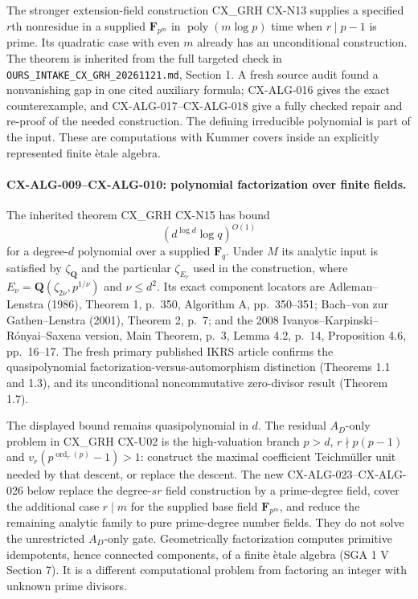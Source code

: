 The stronger extension-field construction CX\_GRH CX-N13 supplies a specified
$r$th nonresidue in a supplied $\mathbf F_{p^m}$ in
$\operatorname{poly}(m\log p)$ time when $r\mid p-1$ is prime. Its quadratic
case with even $m$ already has an unconditional construction. The theorem is
inherited from the full targeted check in
\texttt{OURS\_INTAKE\_CX\_GRH\_20261121.md}, Section 1. A fresh source audit
found a nonvanishing gap in one cited auxiliary formula; CX-ALG-016 gives
the exact counterexample, and CX-ALG-017--CX-ALG-018 give a fully checked
repair and re-proof of the needed construction. The defining
irreducible polynomial is part of the input. These are computations with
Kummer covers inside an explicitly represented finite \`etale algebra.

\paragraph{CX-ALG-009--CX-ALG-010: polynomial factorization over finite fields.}
The inherited theorem CX\_GRH CX-N15 has bound
\[
                 (d^{\log d}\log q)^{O(1)}
\]
for a degree-$d$ polynomial over a supplied $\mathbf F_q$. Under $M$ its
analytic input is satisfied by $\zeta_{\mathbf Q}$ and the particular
$\zeta_{E_\nu}$ used in the construction, where
$E_\nu=\mathbf Q(\zeta_{2\nu},p^{1/\nu})$ and $\nu\leq d^2$.
Its exact component locators are Adleman--Lenstra (1986), Theorem 1, p.~350,
Algorithm A, pp.~350--351; Bach--von zur Gathen--Lenstra (2001), Theorem 2,
p.~7; and the 2008 Ivanyos--Karpinski--R\'onyai--Saxena version, Main Theorem,
p.~3, Lemma 4.2, p.~14, Proposition 4.6, pp.~16--17.
The fresh primary published IKRS article confirms the quasipolynomial
factorization-versus-automorphism distinction (Theorems 1.1 and 1.3), and
its unconditional noncommutative zero-divisor result (Theorem 1.7).

The displayed bound remains quasipolynomial in $d$. The residual $A_D$-only
problem in CX\_GRH CX-U02 is the high-valuation branch
$p>d$, $r\nmid p(p-1)$ and
$v_r(p^{\operatorname{ord}_r(p)}-1)>1$: construct the maximal coefficient
Teichm\"uller unit needed by that descent, or replace the descent. The new
CX-ALG-023--CX-ALG-026 below replace the degree-$sr$ field construction by
a prime-degree field, cover the additional case $r\mid m$ for the supplied
base field $\mathbf F_{p^m}$, and reduce the remaining analytic family to
pure prime-degree number fields. They do not solve the unrestricted
$A_D$-only gate. Geometrically factorization computes
primitive idempotents, hence connected components, of a finite \`etale
algebra (SGA 1 V Section 7). It is a different computational problem from
factoring an integer with unknown prime divisors.

